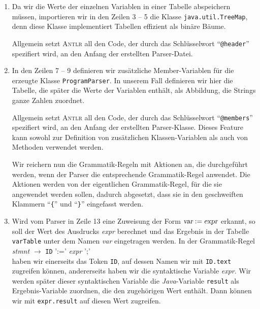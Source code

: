 \begin{enumerate}
\item Da wir die Werte der einzelnen Variablen in einer Tabelle abspeichern m\"ussen,
      importieren wir in den Zeilen 3 -- 5 die Klasse \texttt{java.util.TreeMap}, denn
      diese Klasse implementiert Tabellen effizient als bin\"are B\"aume.

      Allgemein setzt \textsc{Antlr} all den Code, der durch das Schl\"usselwort
      ``\texttt{@header}'' spezifiert wird, an den Anfang der erstellten Parser-Datei.
\item In den Zeilen 7 -- 9 definieren wir zus\"atzliche Member-Variablen f\"ur die erzeugte
      Klasse \texttt{ProgramParser}.  In unserem Fall definieren wir hier die Tabelle, die
      sp\"ater die Werte der Variablen enth\"alt, als Abbildung, die Strings ganze Zahlen zuordnet.

      Allgemein setzt \textsc{Antlr} all den Code, der durch das Schl\"usselwort
      ``\texttt{@members}'' spezifiert wird, an den Anfang der erstellten Parser-Klasse.
      Dieses Feature kann sowohl zur Definition von zus\"atzlichen Klassen-Variablen als auch
      von Methoden verwendet werden.
      
      Wir reichern nun die Grammatik-Regeln mit Aktionen an, die durchgef\"uhrt werden, wenn
      der Parser die entsprechende Grammatik-Regel anwendet.  Die Aktionen werden von der
      eigentlichen Grammatik-Regel, f\"ur die sie angewendet werden sollen, dadurch
      abgesetzt, dass sie in den geschweiften Klammern ``\texttt{\{}'' und ``\texttt{\}}''
      eingefasst werden.
\item Wird vom Parser in Zeile 13 eine Zuweisung der Form $\textsl{var} \;\mathtt{:=}\; \textsl{expr}$
      erkannt,  
      so soll der Wert des Ausdrucks \textsl{expr} berechnet und das Ergebnis in der
      Tabelle \texttt{varTable} unter dem Namen \textsl{var} eingetragen werden.
      In der Grammatik-Regel
      \\[0.2cm]
      \hspace*{1.3cm}
      \textsl{stmnt} $\rightarrow$ \texttt{ID} ':=' \textsl{expr} ';'
      \\[0.2cm]
      haben wir einerseits das Token \texttt{ID}, auf dessen Namen wir mit \texttt{ID.text}
      zugreifen k\"onnen, andererseits haben wir die syntaktische Variable \textsl{expr}.
      Wir werden sp\"ater dieser syntaktischen Variable die \textsl{Java}-Variable
      \texttt{result} als Ergebnis-Variable zuordnen, die den zugeh\"origen Wert enth\"alt.  
      Dann k\"onnen wir mit
      \texttt{expr.result} auf diesen Wert zugreifen.


\end{enumerate}
